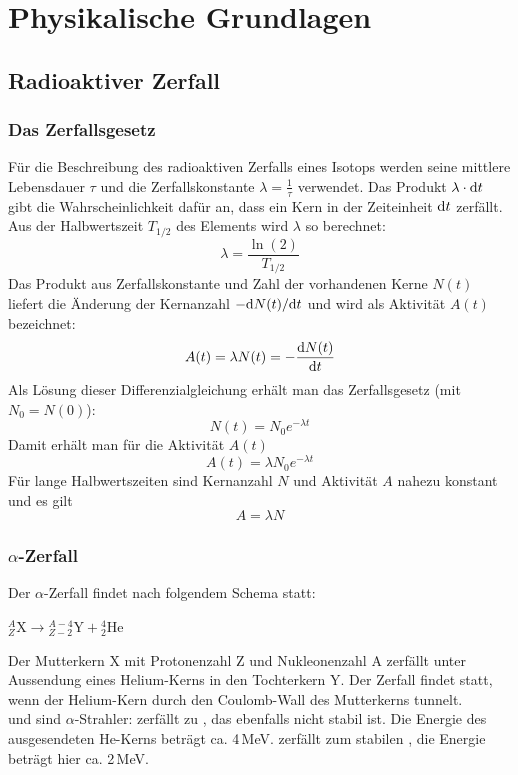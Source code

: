 \section{Physikalische Grundlagen}

\subsection{Radioaktiver Zerfall}
\subsubsection{Das Zerfallsgesetz}
Für die Beschreibung des radioaktiven Zerfalls eines Isotops werden seine mittlere Lebensdauer $\tau$ 
und die Zerfallskonstante $\lambda =\frac{1}{\tau}$ verwendet.
Das Produkt $\lambda \cdot \mathrm{d} t$ gibt die Wahrscheinlichkeit dafür an,
dass ein Kern in der Zeiteinheit $\mathrm{d} t$ zerfällt.
Aus der Halbwertszeit $T_{1/2}$ des Elements wird $\lambda$ so berechnet:
\begin{equation}
\label{eq:lambdahwz}
	\lambda=\frac{\ln (2)}{T_{1/2}}
\end{equation}
Das Produkt aus Zerfallskonstante und Zahl der vorhandenen Kerne $N(t)$ liefert die
Änderung der Kernanzahl $-\mathrm{d} N(t) / {\mathrm{d} t}$ und wird als Aktivität $A(t)$ bezeichnet:
\begin{equation}
	A(t)=\lambda N(t)= -\frac{\mathrm{d} N(t)}{\mathrm{d} t}
\end{equation}
Als Lösung dieser Differenzialgleichung erhält man das Zerfallsgesetz (mit $N_0 = N(0)$):
\begin{equation}
	N(t)=N_0 e^{-\lambda t}
\end{equation}
Damit erhält man für die Aktivität $A(t)$
\begin{equation}
	A(t)=\lambda N_0 e^{-\lambda t}
\end{equation}
Für lange Halbwertszeiten sind Kernanzahl $N$ und Aktivität $A$ nahezu konstant und es gilt
\begin{equation}
\label{eq:aln}
	A=\lambda N
\end{equation}

\subsubsection{$\alpha$-Zerfall}
Der $\alpha$-Zerfall findet nach folgendem Schema statt:
\begin{center}
${}^{A}_{Z}\text{X} \rightarrow {}^{A-4}_{Z-2}\text{Y} + {}^{4}_{2}\text{He}$
\end{center}
Der Mutterkern X mit Protonenzahl Z und Nukleonenzahl A zerfällt unter Aussendung eines Helium-Kerns
in den Tochterkern Y.
Der Zerfall findet statt, wenn der Helium-Kern durch den Coulomb-Wall des Mutterkerns tunnelt.\\
 und  sind $\alpha$-Strahler:
 zerfällt zu , das ebenfalls nicht stabil ist.
Die Energie des ausgesendeten He-Kerns beträgt ca. 4\,MeV.
 zerfällt zum stabilen , die Energie beträgt hier ca. 2\,MeV.

